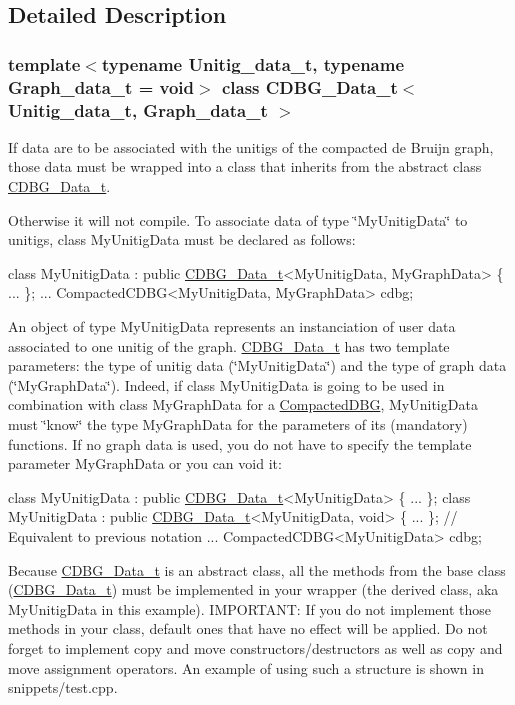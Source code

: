 \subsection{Detailed Description}
\subsubsection*{template$<$typename Unitig\+\_\+data\+\_\+t, typename Graph\+\_\+data\+\_\+t = void$>$\newline
class C\+D\+B\+G\+\_\+\+Data\+\_\+t$<$ Unitig\+\_\+data\+\_\+t, Graph\+\_\+data\+\_\+t $>$}

If data are to be associated with the unitigs of the compacted de Bruijn graph, those data must be wrapped into a class that inherits from the abstract class \hyperlink{classCDBG__Data__t}{C\+D\+B\+G\+\_\+\+Data\+\_\+t}. 

Otherwise it will not compile. To associate data of type \char`\"{}\+My\+Unitig\+Data\char`\"{} to unitigs, class My\+Unitig\+Data must be declared as follows\+: 
\begin{DoxyCode}
\textcolor{keyword}{class }MyUnitigData : \textcolor{keyword}{public} \hyperlink{classCDBG__Data__t}{CDBG\_Data\_t}<MyUnitigData, MyGraphData> \{ ... \};
...
CompactedCDBG<MyUnitigData, MyGraphData> cdbg;
\end{DoxyCode}
 An object of type My\+Unitig\+Data represents an instanciation of user data associated to one unitig of the graph. \hyperlink{classCDBG__Data__t}{C\+D\+B\+G\+\_\+\+Data\+\_\+t} has two template parameters\+: the type of unitig data (\char`\"{}\+My\+Unitig\+Data\char`\"{}) and the type of graph data (\char`\"{}\+My\+Graph\+Data\char`\"{}). Indeed, if class My\+Unitig\+Data is going to be used in combination with class My\+Graph\+Data for a \hyperlink{classCompactedDBG}{Compacted\+D\+BG}, My\+Unitig\+Data must \char`\"{}know\char`\"{} the type My\+Graph\+Data for the parameters of its (mandatory) functions. If no graph data is used, you do not have to specify the template parameter My\+Graph\+Data or you can void it\+: 
\begin{DoxyCode}
\textcolor{keyword}{class }MyUnitigData : \textcolor{keyword}{public} \hyperlink{classCDBG__Data__t}{CDBG\_Data\_t}<MyUnitigData> \{ ... \};
\textcolor{keyword}{class }MyUnitigData : \textcolor{keyword}{public} \hyperlink{classCDBG__Data__t}{CDBG\_Data\_t}<MyUnitigData, void> \{ ... \}; \textcolor{comment}{// Equivalent to previous
       notation}
...
CompactedCDBG<MyUnitigData> cdbg;
\end{DoxyCode}
 Because \hyperlink{classCDBG__Data__t}{C\+D\+B\+G\+\_\+\+Data\+\_\+t} is an abstract class, all the methods from the base class (\hyperlink{classCDBG__Data__t}{C\+D\+B\+G\+\_\+\+Data\+\_\+t}) must be implemented in your wrapper (the derived class, aka My\+Unitig\+Data in this example). I\+M\+P\+O\+R\+T\+A\+NT\+: If you do not implement those methods in your class, default ones that have no effect will be applied. Do not forget to implement copy and move constructors/destructors as well as copy and move assignment operators. An example of using such a structure is shown in snippets/test.\+cpp. 


